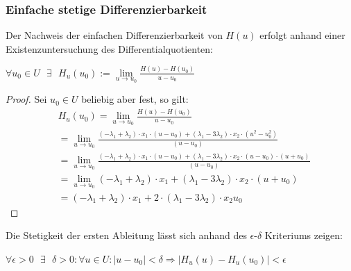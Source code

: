 \subsubsection*{Einfache stetige Differenzierbarkeit}
Der Nachweis der einfachen Differenzierbarkeit von $H(u)$ erfolgt anhand einer Existenzuntersuchung des Differentialquotienten: 
\begin{zz}$ \forall u_0 \in U \text{ } \exists \text{ } H_u(u_0) := \lim\limits_{u \rightarrow u_0} \frac{H(u)-H(u_0)}{u-u_0}$
\end{zz}
\begin{proof}
	Sei $u_0 \in U$ beliebig aber fest, so gilt:
	\begingroup
	\allowdisplaybreaks[3]	
	\begin{align}
		&H_u(u_0)= \lim\limits_{u \rightarrow u_0} \frac{H(u)-H(u_0)}{u-u_0} \\
		& = \lim\limits_{u \rightarrow u_0} \frac{(-\lambda_1 + \lambda_2) \cdot x_1 \cdot (u-u_0) + (\lambda_1 - 3 \lambda_2) \cdot x_2 \cdot (u^2-u_0^2)}{(u-u_0)} \\
		& = \lim\limits_{u \rightarrow u_0} \frac{(-\lambda_1 + \lambda_2) \cdot x_1 \cdot (u-u_0) + (\lambda_1 - 3 \lambda_2) \cdot x_2 \cdot (u-u_0) \cdot (u+u_0)}{(u-u_0)} \\
		& = \lim\limits_{u \rightarrow u_0} (-\lambda_1 + \lambda_2) \cdot x_1 + (\lambda_1 - 3 \lambda_2) \cdot x_2 \cdot (u+u_0)\\
		& = (-\lambda_1 + \lambda_2) \cdot x_1 + 2 \cdot (\lambda_1 - 3 \lambda_2) \cdot x_2 u_0
	\end{align}
	\endgroup
\end{proof}
Die Stetigkeit der ersten Ableitung lässt sich anhand des $\epsilon$-$\delta$ Kriteriums zeigen:
\begin{zz}
$ \forall\epsilon>0 \text{ } \exists \text{ } \delta>0: \forall u\in U: |u-u_0|<\delta \Rightarrow |H_u(u)-H_u(u_0)| < \epsilon $
\end{zz}
